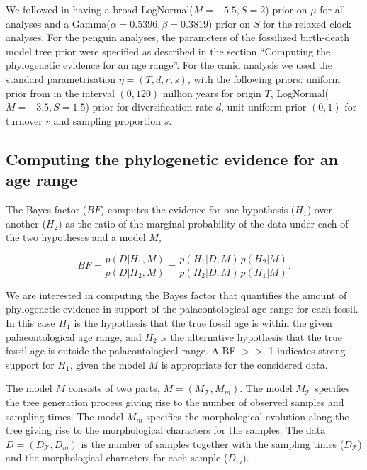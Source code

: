 \documentclass[11pt]{article}
\begin{document}
We followed \cite{gavryushkina2015bayesian} in having a broad LogNormal($M=-5.5, S=2$) prior on $\mu$ for all analyses and a Gamma($\alpha=0.5396, \beta=0.3819$) prior on $S$ for the relaxed clock analyses.
For the penguin analyses, the parameters of the fossilized birth-death model tree prior  were specified as described in the section ``Computing the phylogenetic evidence for an age range''. 
For the canid analysis we used the standard parametrisation $\eta=(T,d,r,s)$, with the following priors: uniform prior from in the interval $(0, 120)$ million years for origin $T$, LogNormal($M=-3.5, S=1.5$) prior for diversification rate $d$, unit uniform prior $(0,1)$ for turnover $r$ and sampling proportion $s$.

\subsection*{Computing the phylogenetic evidence for an age range}

The Bayes factor ($BF$) computes the evidence for one hypothesis ($H_1$) over another ($H_2$) as the ratio of the marginal probability of the data under each of the two hypotheses and a model $M$, 

\begin{equation}
BF = \frac{p(D|H_1,M)}{p(D|H_2,M)} = \frac{p(H_1|D,M)}{p(H_2|D,M)}\frac{p(H_2|M)}{p(H_1|M)}.
\end{equation}

We are interested in computing the Bayes factor that quantifies the amount of phylogenetic evidence in support of the palaeontological age range for each fossil. In this case $H_1$ is the hypothesis that the true fossil age is within the given palaeontological age range, and $H_2$ is the alternative hypothesis that the true fossil age is outside the palaeontological range. A BF $>>$ 1 indicates strong support for $H_1$, given the model $M$ is appropriate for the considered data.


The model $M$ consists of two parts, $M=(M_\mathcal{T},M_m)$. The model $M_\mathcal{T}$ specifies the tree generation process  giving rise to the number of observed samples and sampling times. The model $M_m$ specifies the morphological evolution along the tree giving rise to the morphological characters for the samples. The data $D=(D_\mathcal{T},D_m)$ is the number of samples together with the sampling times ($D_\mathcal{T}$) and  the morphological characters for each sample ($D_m$). 
\end{document}
